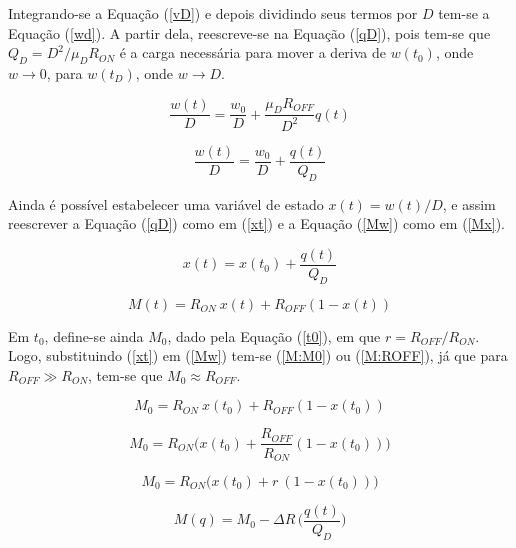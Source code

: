 \documentclass{ceel}
\begin{document}
\begin{multicols}{2}
Integrando-se a Equação (\ref{vD}) e depois dividindo seus termos por $D$ tem-se a Equação (\ref{wd}).
A partir dela, reescreve-se na Equação (\ref{qD}), pois tem-se que $Q_D=D^2/\mu_D R_{ON}$ é a carga necessária para mover a deriva de $w(t_0)$, onde $w\rightarrow 0$, para $w(t_D)$, onde $w\rightarrow D$.

\begin{equation}\label{wd}
\dfrac{w(t)}{D}=\dfrac{w_0}{D}+\dfrac{\mu_D R_{OFF}}{D^2}q(t)
\end{equation}

\begin{equation}\label{qD}
\dfrac{w(t)}{D}=\dfrac{w_0}{D}+\dfrac{q(t)}{Q_D}
\end{equation}
\vspace{0.05cm}

Ainda é possível estabelecer uma variável de estado $x(t)=w(t)/D$, e assim reescrever a Equação (\ref{qD}) como em (\ref{xt}) e a Equação (\ref{Mw}) como em (\ref{Mx}).

\begin{equation}\label{xt}
x(t)=x(t_0)+\dfrac{q(t)}{Q_D}
\end{equation}

\begin{equation}\label{Mx}
M(t)=R_{ON}\ x(t)+ R_{OFF}(1-x(t))
\end{equation}
\vspace{0.05cm}

Em $t_0$, define-se ainda $M_0$, dado pela Equação (\ref{t0}), em que $r=R_{OFF}/R_{ON}$. Logo, substituindo (\ref{xt}) em (\ref{Mw}) tem-se (\ref{M:M0}) ou (\ref{M:ROFF}), já que para $R_{OFF}\gg R_{ON}$, tem-se que $M_0\approx R_{OFF}$.
\vspace{0.05cm}

\begin{equation*}
M_0=R_{ON}\ x(t_0)+ R_{OFF}(1-x(t_0))
\end{equation*}

\begin{equation*}
    M_0=R_{ON}\bigg( x(t_0)+ \dfrac{R_{OFF}}{R_{ON}} (1-x(t_0))\bigg)
\end{equation*}

\begin{equation}\label{t0}
M_0  =R_{ON}\big( x(t_0)+ r\ (1-x(t_0))\big)
\end{equation}

\begin{equation}\label{M:M0}%
M(q)=M_0-\Delta R\, \bigg(\dfrac{q(t)}{Q_D}\bigg)
\end{equation}


\end{multicols}
\end{document}
